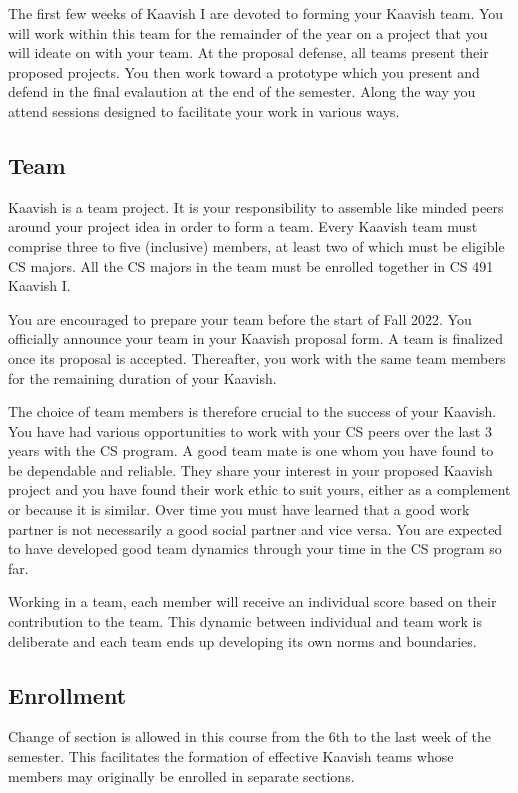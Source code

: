 \documentclass[a4paper]{article}
\newcommand{\new}[1]{{#1}}
\begin{document}
\new{The first few weeks of Kaavish I are devoted to forming your Kaavish team. You will work within this team for the remainder of the year on a project that you will ideate on with your team. At the proposal defense, all teams present their proposed projects. You then work toward a prototype which you present and defend in the final evalaution at the end of the semester. Along the way you attend sessions designed to facilitate your work in various ways.}


\subsection{Team}

Kaavish is a team project. It is your responsibility to assemble like minded peers around your project idea in order to form a team. Every Kaavish team must comprise three to five (inclusive) members, at least two of which must be eligible CS majors. All the CS majors in the team must be enrolled together in CS 491 Kaavish I. 

You are encouraged to prepare your team before the start of Fall 2022. You officially announce your team in your Kaavish proposal form. A team is finalized once its proposal is accepted. Thereafter, you work with the same team members for the remaining duration of your Kaavish.

The choice of team members is therefore crucial to the success of your Kaavish. You have had various opportunities to work with your CS peers over the last 3 years with the CS program. A good team mate is one whom you have found to be dependable and reliable. They share your interest in your proposed Kaavish project and you have found their work ethic to suit yours, either as a complement or because it is similar. Over time you must have learned that a good work partner is not necessarily a good social partner and vice versa. You are expected to have developed good team dynamics through your time in the CS program so far.

Working in a team, each member will receive an individual score based on their contribution to the team. This dynamic between individual and team work is deliberate and each team ends up developing its own norms and boundaries.

\subsection{Enrollment}

Change of section is allowed in this course from the 6th to the last week of the semester. This facilitates the formation of effective Kaavish teams whose members may originally be enrolled in separate sections.
\end{document}
